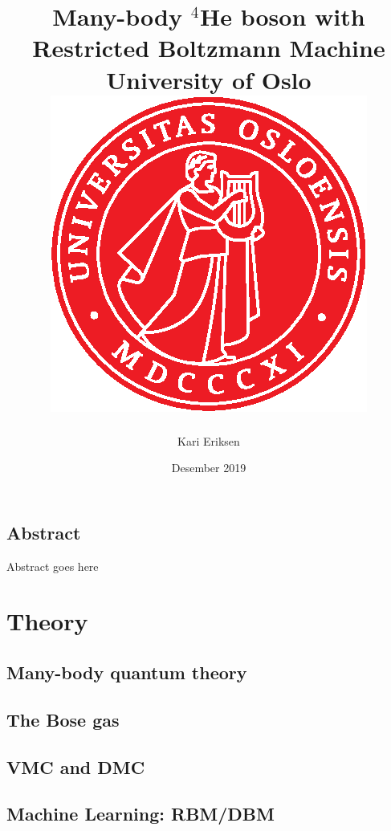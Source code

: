 \documentclass[12pt, twoside]{report}
\title{{Many-body $^4$He boson with Restricted Boltzmann Machine}\\
{\large University of Oslo}\\
\includegraphics[scale=1.0]{uio_logo2.eps}
}
\author{Kari Eriksen}
\date{Desember 2019}
\begin{document}
\maketitle

\chapter*{Abstract}
Abstract goes here

\tableofcontents
 
 


%

\part{Theory}
 
\chapter{Many-body quantum theory}


\chapter{The Bose gas}

 
\chapter{VMC and DMC}

 
\chapter{Machine Learning: RBM/DBM}

\end{document}
